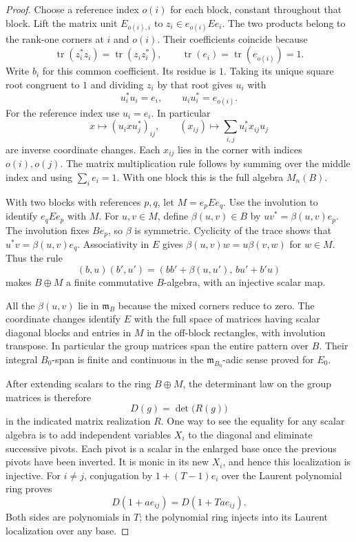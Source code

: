 \begin{proof}
Choose a reference index \(o(i)\) for each block, constant
throughout that block. Lift the matrix unit \(E_{o(i),i}\)
to \(z_i\in e_{o(i)}Ee_i\). The two products belong to the rank-one corners at \(i\) and
\(o(i)\). Their coefficients coincide because
\[
 \operatorname{tr}(z_i^*z_i)=\operatorname{tr}(z_i z_i^*),
 \qquad \operatorname{tr}(e_i)=\operatorname{tr}(e_{o(i)})=1.
\]
Write \(b_i\) for this common coefficient. Its residue
is \(1\). Taking its unique square root congruent to \(1\)
and dividing \(z_i\) by that root gives \(u_i\) with
\[
            u_i^*u_i=e_i,\qquad u_i u_i^*=e_{o(i)} .
\]
For the reference index use \(u_i=e_i\).  In particular
\[
      x\longmapsto (u_i x u_j^*)_{ij},
      \qquad (x_{ij})\longmapsto\sum_{i,j}u_i^*x_{ij}u_j
\]
are inverse coordinate changes. Each \(x_{ij}\) lies in the
corner with indices \(o(i),o(j)\). The matrix multiplication
rule follows by summing over the middle index and using
\(\sum_i e_i=1\). With one block this is the full algebra
\(M_n(B)\).

With two blocks with references \(p,q\), let \(M=e_pEe_q\).
Use the involution to identify \(e_qEe_p\) with \(M\).
For \(u,v\in M\), define \(\beta(u,v)\in B\) by
\(uv^*=\beta(u,v)e_p\). The involution fixes \(Be_p\),
so \(\beta\) is symmetric. Cyclicity of the trace shows that
\(u^*v=\beta(u,v)e_q\). Associativity in \(E\) gives
\(\beta(u,v)w=u\beta(v,w)\) for \(w\in M\).
Thus the rule
\[
       (b,u)(b',u')=(bb'+\beta(u,u'),\,bu'+b'u)
\]
makes \(B\oplus M\) a finite commutative \(B\)-algebra,
with an injective scalar map.

All the \(\beta(u,v)\) lie
in \(\mathfrak m_B\) because the mixed corners reduce to zero.
The coordinate changes identify \(E\) with the full space of
matrices having scalar diagonal blocks and entries in \(M\)
in the off-block rectangles, with involution transpose.
 In particular the group matrices
span the entire pattern over \(B\). Their integral
\(B_0\)-span is finite and continuous in the
\(\mathfrak m_{B_0}\)-adic sense proved for \(E_0\).
\label{cor:ordinary-patching-matrices-6}

After extending scalars to the ring \(B\oplus M\), the determinant law on the group matrices is therefore
\[
 D(g)=\det\bigl(R(g)\bigr)
\]
in the indicated matrix realization \(R\).
One way to see the equality for any scalar algebra is to add
independent variables \(X_i\) to the diagonal and eliminate
successive pivots. Each pivot is a scalar in the enlarged
base once the previous pivots have been inverted. It is
monic in its new \(X_i\), and hence this localization is
injective. For \(i\ne j\), conjugation by \(1+(T-1)e_i\) over the
Laurent polynomial ring proves
\[
 D(1+a e_{ij})=D(1+Ta e_{ij}).
\]
Both sides are polynomials in \(T\); the polynomial ring
injects into its Laurent localization over any base.


\end{proof}
